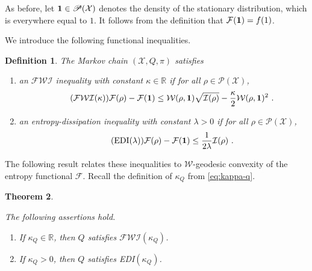 \documentclass[a4paper,11pt,reqno]{amsart}
\theoremstyle{plain}
\newtheorem{theorem}{Theorem}[section]
\newtheorem{definition}[theorem]{Definition}
\theoremstyle{remark}
\numberwithin{equation}{section}
\begin{document}
As before, let ${{{\bf 1}}} \in {{\mathscr{P}}({\mathcal{X}})}$ denotes the density of the stationary
distribution, which is everywhere equal to $1$. It follows from the
definition that ${\mathcal{F}}({{{\bf 1}}}) = f(1)$.

We introduce the following functional inequalities.

\begin{definition}\label{def:functional-inequalities}
  The Markov chain $({\mathcal{X}}, Q, \pi)$ satisfies 
\begin{enumerate}
\item an ${\mathcal{F}}{\mathcal{W}}{\mathcal{I}}$ inequality with
  constant $\kappa\in{{\mathbb R}}$ if for all
  $\rho\in{{\mathscr{P}}({\mathcal{X}})}$,
  \begin{align}\label{eq:FWI}
  \tag{{${\mathcal{F}}{\mathcal{W}}{\mathcal{I}}$}($\kappa$)}
    {\mathcal{F}}(\rho) - {\mathcal{F}}({{{\bf 1}}}) \leq {\mathcal{W}}(\rho,{{{\bf 1}}})\sqrt{{\mathcal{I}}(\rho)}-\frac{\kappa}{2}{\mathcal{W}}(\rho,{{{\bf 1}}})^2\ .
  \end{align}
\item an \emph{entropy-dissipation} inequality with constant
  $\lambda>0$ if for all $\rho\in{{\mathscr{P}}({\mathcal{X}})}$,
  \begin{align}
  \tag{EDI($\lambda$)}
  \label{eq:EDI}
    {\mathcal{F}}(\rho) - {\mathcal{F}}({{{\bf 1}}}) \leq \frac{1}{2\lambda}{\mathcal{I}}(\rho)\ .
  \end{align}
\end{enumerate}  
\end{definition}

The following result relates these inequalities to ${\mathcal{W}}$-geodesic
convexity of the entropy functional ${\mathcal{F}}$. Recall the definition of
$\kappa_Q$ from \eqref{eq:kappa-q}.

\begin{theorem}\label{thm:functional-inequalities} 

  The following assertions hold.
  \begin{enumerate}
  \item If $\kappa_Q\in{{\mathbb R}}$, then $Q$
    satisfies ${\mathcal{F}}{\mathcal{W}}{\mathcal{I}}(\kappa_Q)$.
  \item If $\kappa_Q>0$, then $Q$
    satisfies EDI$(\kappa_Q)$.
  \end{enumerate}
\end{theorem}
\end{document}
